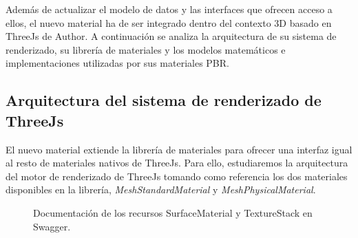 Adem\'as de actualizar el modelo de datos y las interfaces que ofrecen acceso a ellos, el nuevo material ha de ser integrado
dentro del contexto 3D basado en ThreeJs de Author. A continuaci\'on se analiza la arquitectura de su sistema de renderizado,
su librer\'ia de materiales y los modelos matem\'aticos e implementaciones utilizadas por sus materiales PBR.\\





\subsection{Arquitectura del sistema de renderizado de ThreeJs}
El nuevo material extiende la librer\'ia de materiales para ofrecer una interfaz igual al resto de materiales nativos
de ThreeJs. Para ello, estudiaremos la arquitectura del motor de renderizado de ThreeJs tomando como referencia los dos
materiales disponibles en la librer\'ia, \textit{MeshStandardMaterial} y \textit{MeshPhysicalMaterial}.

\begin{figure}[H]
  \vspace{0.5cm}
  \centering
  \caption{Documentaci\'on de los recursos SurfaceMaterial y TextureStack en Swagger.}
  \vspace{0.5cm}
\end{figure}

